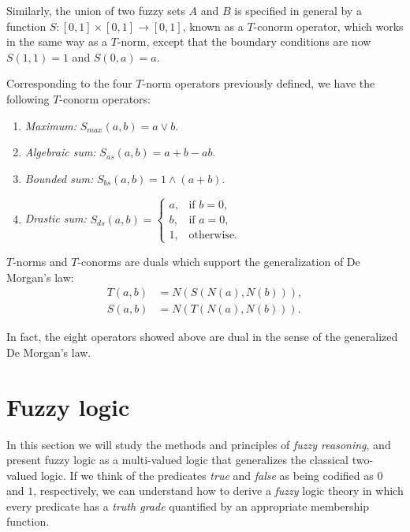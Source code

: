 \begin{definition} Similarly, the union of two fuzzy sets $A$ and $B$ is specified in general by a function $S:[0,1]\times [0,1] \to [0,1]$, known as a $T$-conorm operator, which works in the same way as a $T$-norm, except that the boundary conditions are now $S(1,1) = 1$ and $S(0,a) = a$.

\end{definition}

Corresponding to the four $T$-norm operators previously defined, we have the following $T$-conorm operators:

\begin{enumerate}
	\item \textit{Maximum:} $S_{max}(a,b) = a \lor b$.
	\item \textit{Algebraic sum:} $S_{as}(a,b)=a + b - ab$.
	\item \textit{Bounded sum:} $S_{bs}(a,b) = 1 \land (a+b)$.
	\item \textit{Drastic sum:} $S_{ds}(a,b) = \begin{cases}
	                                      a, & \text{if } b = 0,\\
	                                      b, & \text{if } a = 0,\\
	                                      1, & \text{otherwise}.
                                          \end{cases}$
\end{enumerate}

\begin{theorem} $T$-norms and $T$-conorms are duals which support the generalization of De Morgan's law:
\begin{align*}
	T(a,b) &= N(S(N(a),N(b))),\\
	S(a,b) &= N(T(N(a), N(b))).
\end{align*}

\end{theorem}

In fact, the eight operators showed above are dual in the sense of the generalized De Morgan's law.

\section{Fuzzy logic}

In this section we will study the methods and principles of \textit{fuzzy reasoning}, and present fuzzy logic as a multi-valued logic that generalizes the classical two-valued logic. If we think of the predicates \textit{true} and \textit{false} as being codified as $0$ and $1$, respectively, we can understand how to derive a \textit{fuzzy} logic theory in which every predicate has a \textit{truth grade} quantified by an appropriate membership function.

